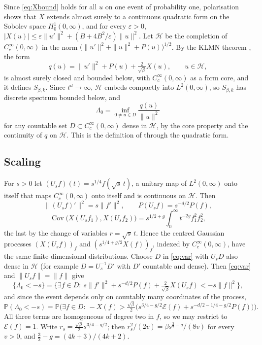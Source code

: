 \documentclass[11pt]{article}
\theoremstyle{remark}
\newcommand{\Prob}{\mathbb{P}}
\begin{document}
Since \eqref{eq:Xbound} holds for all $u$ on one event of probability one, polarisation shows that $X$ extends
almost surely to a continuous quadratic form on the Sobolev space $H_0^1(0,\infty)$, and for every $\varepsilon>0$,
$|X(u)|\le\varepsilon\|u'\|^2+(B+4B^2/\varepsilon)\|u\|^2$. Let $\mathcal H$ be the completion of
$C_c^\infty(0,\infty)$ in the norm $\bigl(\|u'\|^2+\|u\|^2+P(u)\bigr)^{1/2}$. By the KLMN theorem
\cite{RS2}, the form
\[
q(u)=\|u'\|^2+P(u)+\tfrac{2}{\sqrt\beta}X(u),\qquad u\in\mathcal H,
\]
is almost surely closed and bounded below, with $C_c^\infty(0,\infty)$ as a form core, and it defines $S_{\beta,k}$.
Since $t^d\to\infty$, $\mathcal H$ embeds compactly into $L^2(0,\infty)$, so $S_{\beta,k}$ has discrete spectrum
bounded below, and
\begin{equation}\label{eq:var}
\Lambda_0=\inf_{0\ne u\in D}\frac{q(u)}{\|u\|^2}
\end{equation}
for any countable set $D\subset C_c^\infty(0,\infty)$ dense in $\mathcal H$, by the core property and the continuity of
$q$ on $\mathcal H$. This is the definition of \cite{KRVarxiv,Bas} through the quadratic form.

\subsection{Scaling}

For $s>0$ let $(U_sf)(t)=s^{1/4}f(\sqrt s\,t)$, a unitary map of $L^2(0,\infty)$ onto itself that maps
$C_c^\infty(0,\infty)$ onto itself and is continuous on $\mathcal H$. Then
\[
\|(U_sf)'\|^2=s\|f'\|^2,\qquad P(U_sf)=s^{-d/2}P(f),
\]
\[
\operatorname{Cov}\bigl(X(U_sf_1),X(U_sf_2)\bigr)=s^{1/2+g}\int_0^\infty t^{-2g}f_1^2f_2^2,
\]
the last by the change of variables $r=\sqrt s\,t$. Hence the centred Gaussian processes $(X(U_sf))_f$ and
$(s^{1/4+g/2}X(f))_f$, indexed by $C_c^\infty(0,\infty)$, have the same finite-dimensional distributions. Choose $D$ in
\eqref{eq:var} with $U_sD$ also dense in $\mathcal H$ (for example $D=U_s^{-1}D'$ with $D'$ countable and dense).
Then \eqref{eq:var} and $\|U_sf\|=\|f\|$ give
\[
\{\Lambda_0<-s\}=\Big\{\exists f\in D:\ s\|f'\|^2+s^{-d/2}P(f)+\tfrac{2}{\sqrt\beta}X(U_sf)<-s\|f\|^2\Big\},
\]
and since the event depends only on countably many coordinates of the process,
\[
\Prob(\Lambda_0<-s)=\Prob\Big(\exists f\in D:\ -X(f)>\tfrac{\sqrt\beta}{2}\bigl(s^{3/4-g/2}\mathcal E(f)
+s^{-d/2-1/4-g/2}P(f)\bigr)\Big).
\]
All three terms are homogeneous of degree two in $f$, so we may restrict to $\mathcal E(f)=1$. Write
$r_s=\frac{\sqrt\beta}{2}s^{3/4-g/2}$; then $r_s^2/(2v)=\beta s^{\frac32-g}/(8v)$ for every $v>0$, and
$\frac32-g=(4k+3)/(4k+2)$.
\end{document}
